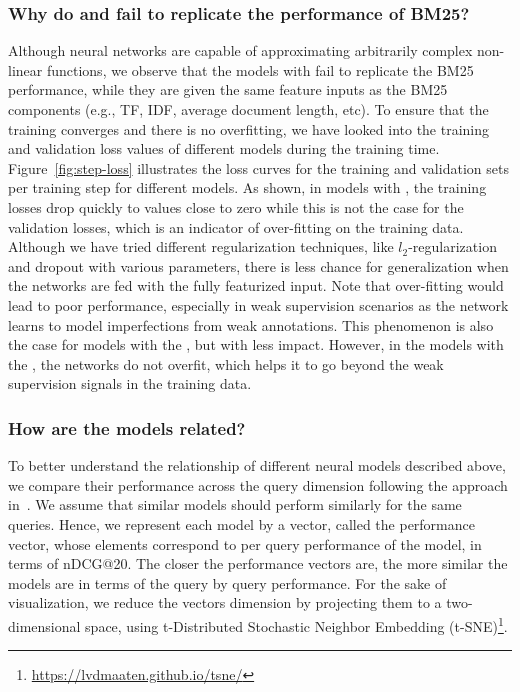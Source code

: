 \subsubsection{Why do \feedone and \feedtwo fail to replicate the performance of BM25?}
%
Although neural networks are capable of approximating arbitrarily complex non-linear functions, we observe that the models with \feedone fail to replicate the BM25 performance, while they are given the same feature inputs as the BM25 components (e.g., TF, IDF, average document length, etc). To ensure that the training converges and there is no overfitting, we have looked into the training and validation loss values of different models during the training time. Figure~\ref{fig:step-loss} illustrates the loss curves for the training and validation sets per training step for different models.
%
As shown, in models with \feedone, the training losses drop quickly to values close to zero while this is not the case for the validation losses, which is an indicator of over-fitting on the training data. 
Although we have tried different regularization techniques, like $l_2$-regularization and dropout with various parameters, there is less chance for generalization when the networks are fed with the fully featurized input. Note that over-fitting would lead to poor performance, especially in weak supervision scenarios as the network learns to model imperfections from weak annotations. 
%
This phenomenon is also the case for models with the \feedtwo, but with less impact. However, in the models with the \feedthree, the networks do not overfit, which helps it to go beyond the weak supervision signals in the training data.


\subsubsection{How are the models related?}
%
To better understand the relationship of different neural models described above, we compare their performance across the query dimension following the approach in~\citep{Mitra:2016}. 
We assume that similar models should perform similarly for the same queries. Hence, we represent each model by a vector, called the performance vector, whose elements correspond to per query performance of the model, in terms of nDCG@20. The closer the performance vectors are, the more similar the models are in terms of the query by query performance. For the sake of visualization, we reduce the vectors dimension by projecting them to a two-dimensional space, using t-Distributed Stochastic Neighbor Embedding (t-SNE)\footnote{\url{https://lvdmaaten.github.io/tsne/}}.

